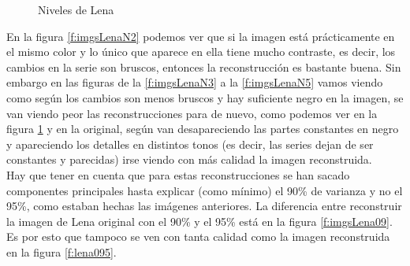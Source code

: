 \begin{figure}
 \centering
 \caption{Niveles de Lena}
 \label{f:imgsLenaN6}
\end{figure}

En la figura \ref{f:imgsLenaN2} podemos ver que si la imagen está prácticamente en el mismo color y lo único que aparece en ella tiene mucho contraste, es decir, los cambios en la serie son bruscos, entonces la reconstrucción es bastante buena. Sin embargo en las figuras de la \ref{f:imgsLenaN3} a la \ref{f:imgsLenaN5} vamos viendo como según los cambios son menos bruscos y hay suficiente negro en la imagen, se van viendo peor las reconstrucciones para de nuevo, como podemos ver en la figura \ref{f:imgsLenaN6} y en la original, según van desapareciendo las partes constantes en negro y apareciendo los detalles en distintos tonos (es decir, las series dejan de ser constantes y parecidas) irse viendo con más calidad la imagen reconstruida.\\

Hay que tener en cuenta que para estas reconstrucciones se han sacado componentes principales hasta explicar (como mínimo) el 90\% de varianza y no el 95\%, como estaban hechas las imágenes anteriores. La diferencia entre reconstruir la imagen de Lena original con el 90\% y el 95\% está en la figura \ref{f:imgsLena09}. Es por esto que tampoco se ven con tanta calidad como la imagen reconstruida en la figura \ref{f:lena095}.\\

